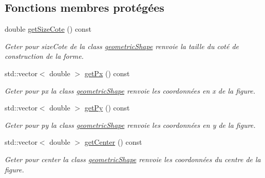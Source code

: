 \subsection*{Fonctions membres protégées}
\begin{DoxyCompactItemize}
\item 
\mbox{\label{classgeometric_shape_1_1_shape_af20eddd3fa1bf6ec35f9ed942c21d488}} 
double \hyperlink{classgeometric_shape_1_1_shape_af20eddd3fa1bf6ec35f9ed942c21d488}{get\+Size\+Cote} () const
\begin{DoxyCompactList}\small\item\em Geter pour size\+Cote de la class \hyperlink{namespacegeometric_shape}{geometric\+Shape} renvoie la taille du coté de construction de la forme. \end{DoxyCompactList}\item 
\mbox{\label{classgeometric_shape_1_1_shape_a9e9ef6bc53c00e40d8be8d46709d57ad}} 
std\+::vector$<$ double $>$ \hyperlink{classgeometric_shape_1_1_shape_a9e9ef6bc53c00e40d8be8d46709d57ad}{get\+Px} () const
\begin{DoxyCompactList}\small\item\em Geter pour px la class \hyperlink{namespacegeometric_shape}{geometric\+Shape} renvoie les coordonnées en x de la figure. \end{DoxyCompactList}\item 
\mbox{\label{classgeometric_shape_1_1_shape_a2191b95552288e73c4b7b4852b063d12}} 
std\+::vector$<$ double $>$ \hyperlink{classgeometric_shape_1_1_shape_a2191b95552288e73c4b7b4852b063d12}{get\+Py} () const
\begin{DoxyCompactList}\small\item\em Geter pour py la class \hyperlink{namespacegeometric_shape}{geometric\+Shape} renvoie les coordonnées en y de la figure. \end{DoxyCompactList}\item 
\mbox{\label{classgeometric_shape_1_1_shape_aa22dac66031a0b7e87615d8402891d90}} 
std\+::vector$<$ double $>$ \hyperlink{classgeometric_shape_1_1_shape_aa22dac66031a0b7e87615d8402891d90}{get\+Center} () const
\begin{DoxyCompactList}\small\item\em Geter pour center la class \hyperlink{namespacegeometric_shape}{geometric\+Shape} renvoie les coordonnées du centre de la figure. \end{DoxyCompactList}\item 

\end{DoxyCompactItemize}

